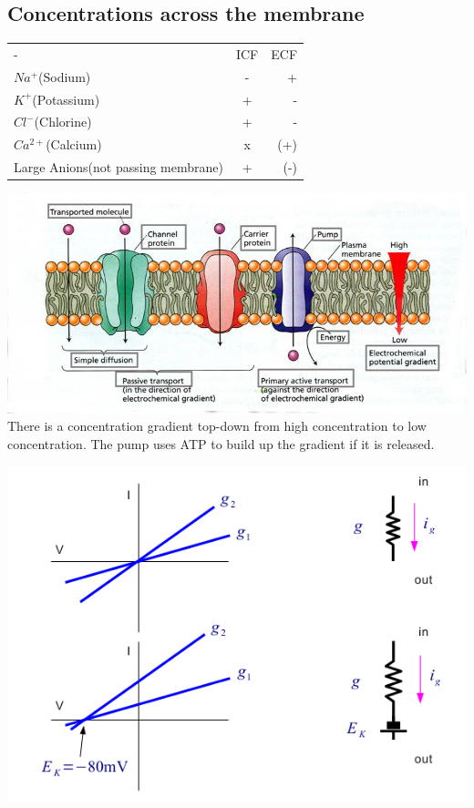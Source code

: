 \documentclass[english,11pt]{article}
\begin{document}
\subsection{Concentrations across the membrane}

\begin{tabular}{ l | c | r }
 -	& ICF & ECF \\
  $Na^+$(Sodium) & - & + \\
  $K^+$(Potassium) & + & - \\
  $Cl^-$(Chlorine) & + & - \\
  $Ca^{2+}$(Calcium) & x & (+) \\
  Large Anions(not passing membrane) & + & (-) \\
\end{tabular}

\includegraphics[width=\textwidth]{bilayer-closeup2.png}
There is a concentration gradient top-down from high concentration to low concentration. The pump uses ATP to build up the gradient if it is released.

\includegraphics[width=\textwidth]{different-conductors.png}
\end{document}
